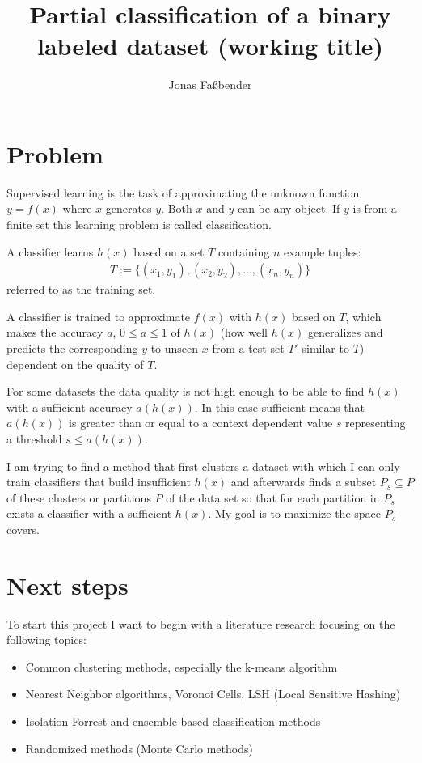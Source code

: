 \documentclass[12pt]{article}
\title{Partial classification of a binary labeled dataset
  (working title)}
\author{Jonas Fa{\ss}bender}
\date{}
\begin{document}
\maketitle

\section{Problem}

Supervised learning is the task of approximating the
unknown function $y = f(x)$ where $x$ generates
$y$. Both $x$ and $y$ can be any object. If $y$ is from a
finite set this learning problem is called classification.

A classifier learns $h(x)$ based on a set $T$ containing
$n$ example tuples:
\begin{align*}
T := \{(x_1, y_1), (x_2, y_2), \dots ,(x_n,y_n)\}
\end{align*}
referred to as the training set.\cite{ki}

A classifier is trained to approximate $f(x)$ with $h(x)$
based on $T$, which makes the accuracy $a$,
$0 \leq a \leq 1$ of $h(x)$ (how well $h(x)$ generalizes
and predicts the corresponding $y$ to unseen $x$ from a
test set $T'$ similar to $T$) dependent on the quality of
$T$.\cite{tc_data}

For some datasets the data quality is not high
enough to be able to find $h(x)$ with a sufficient
accuracy $a(h(x))$. In this case sufficient means that
$a(h(x))$ is greater than or equal to a context dependent
value $s$ representing a threshold $s \leq a(h(x))$.

I am trying to find a method that first clusters a dataset
with which I can only train classifiers that build
insufficient $h(x)$ and afterwards finds a subset
$P_s \subseteq P$ of these clusters or partitions $P$ of
the data set so that for each partition in $P_s$ exists a
classifier with a sufficient $h(x)$. My goal is to maximize
the space $P_s$ covers.

\section{Next steps}

To start this project I want to begin with a literature
research focusing on the following topics:

\begin{itemize}

  \item Common clustering methods, especially the k-means
        algorithm

  \item Nearest Neighbor algorithms, Voronoi Cells, LSH
        (Local Sensitive Hashing)

  \item Isolation Forrest and ensemble-based classification
        methods

  \item Randomized methods (Monte Carlo methods)

\end{itemize}


\end{document}
